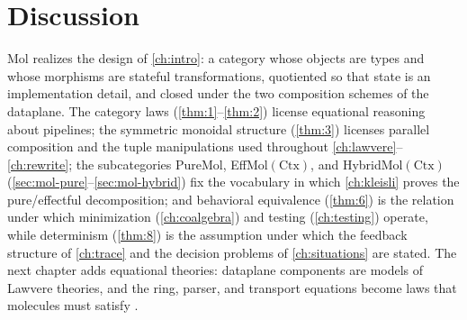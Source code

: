 \section{Discussion}\label{sec:mol-concl}

Mol realizes the design of \autoref{ch:intro}: a category whose objects are
types and whose morphisms are stateful transformations, quotiented so that
state is an implementation detail, and closed under the two composition
schemes of the dataplane. The category laws (\autoref{thm:1}--\autoref{thm:2}) license equational
reasoning about pipelines; the symmetric monoidal structure (\autoref{thm:3}) licenses
parallel composition and the tuple manipulations used throughout
\autoref{ch:lawvere}--\autoref{ch:rewrite}; the subcategories PureMol,
EffMol$(\mathrm{Ctx})$, and HybridMol$(\mathrm{Ctx})$
(\autoref{sec:mol-pure}--\autoref{sec:mol-hybrid}) fix the vocabulary in
which \autoref{ch:kleisli} proves the pure/effectful decomposition; and
behavioral equivalence (\autoref{thm:6}) is the relation under which minimization
(\autoref{ch:coalgebra}) and testing (\autoref{ch:testing}) operate, while
determinism (\autoref{thm:8}) is the assumption under which the feedback structure of
\autoref{ch:trace} and the decision problems of \autoref{ch:situations} are
stated. The next chapter adds equational theories: dataplane components are
models of Lawvere theories, and the ring, parser, and transport equations
become laws that molecules must satisfy \citep{lawvere}.

